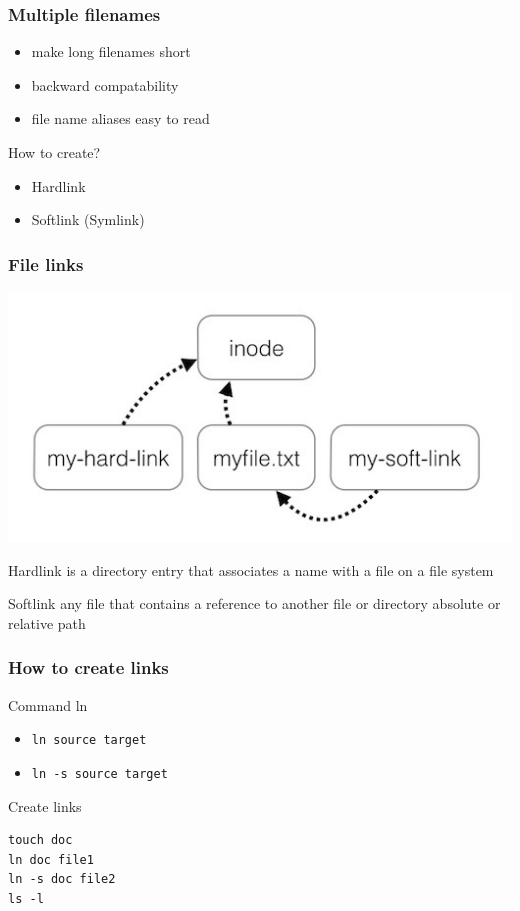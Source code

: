 \begin{frame}
	\frametitle{Multiple filenames}
			\begin{itemize}
				\item make long filenames short
				\item backward compatability
				\item file name aliases easy to read
			\end{itemize}
			How to create?
			\pause
			\begin{itemize}
				\item Hardlink
				\item Softlink (Symlink)
			\end{itemize}
\end{frame}

\begin{frame}
	\frametitle{File links}
	\includegraphics[height=0.4\textheight]{../../slides/cmdline/clipart/hardlink_softlink.jpg}
	\begin{block}{Hardlink}
	is a directory entry that associates a name with a file on a file system
        \end{block}
	\begin{block}{Softlink}
	any file that contains a reference to another file or directory 
	absolute or relative path 
        \end{block}
\end{frame}

\begin{frame}[fragile]
	\frametitle{How to create links}
	\begin{block}{Command ln}
		\begin{itemize}
			\item {\tt ln source target}
			\item {\tt ln -s source target}
		\end{itemize}
        \end{block}
	Create links

	\begin{lstlisting}
touch doc 
ln doc file1
ln -s doc file2
ls -l
	\end{lstlisting}
\end{frame}

